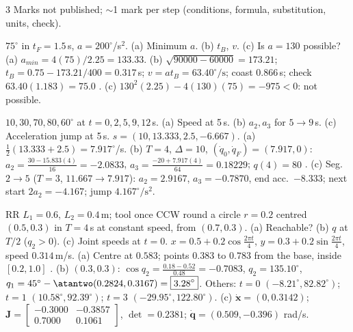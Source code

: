 \begin{multicols}{3}
Marks not published; $\sim$1 mark per step (conditions, formula, substitution, units, check).
\begin{examq}
$75^\circ$ in $t_F=1.5$\,s, $a=200^\circ$/s$^2$. (a) Minimum $a$. (b) $t_B$, $v$. (c) Is $a=130$ possible?
\solution
(a) $a_{min}=4(75)/2.25=133.33$. (b) $\sqrt{90000-60000}=173.21$; $t_B=0.75-173.21/400=0.317$\,s; $v=at_B=\boxed{63.40^\circ/\text{s}}$; coast $0.866$\,s; check $63.40(1.183)=75.0$ \checkmark. (c) $130^2(2.25)-4(130)(75)=-975<0$: not possible. \chk
\end{examq}
\begin{examq}
$10,30,70,80,60^\circ$ at $t=0,2,5,9,12$\,s. (a) Speed at 5\,s. (b) $a_2,a_3$ for $5\to9$\,s. (c) Acceleration jump at 5\,s.
\solution
$s=(10,13.333,2.5,-6.667)$. (a) $\frac12(13.333+2.5)=7.917^\circ$/s. (b) $T=4$, $\Delta=10$, $(\dot q_0,\dot q_F)=(7.917,0)$: $a_2=\frac{30-15.833(4)}{16}=-2.0833$, $a_3=\frac{-20+7.917(4)}{64}=0.18229$; $q(4)=80$ \checkmark. (c) Seg.\,$2\to5$ ($T=3$, $11.667\to7.917$): $a_2=2.9167$, $a_3=-0.7870$, end acc.\ $-8.333$; next start $2a_2=-4.167$; jump $\boxed{4.167^\circ/\text{s}^2}$. \chk
\end{examq}
\begin{examq}
RR $L_1{=}0.6$, $L_2{=}0.4$\,m; tool once CCW round a circle $r{=}0.2$ centred $(0.5,0.3)$ in $T{=}4$\,s at constant speed, from $(0.7,0.3)$. (a) Reachable? (b) $q$ at $T/2$ ($q_2>0$). (c) Joint speeds at $t{=}0$.
\solution
$x=0.5+0.2\cos\frac{2\pi t}4$, $y=0.3+0.2\sin\frac{2\pi t}4$, speed $0.314$\,m/s. (a) Centre at $0.583$; points $0.383$ to $0.783$ from the base, inside $[0.2,1.0]$ \checkmark. (b) $(0.3,0.3)$: $\cos q_2=\frac{0.18-0.52}{0.48}=-0.7083$, $q_2=135.10^\circ$, $q_1=45^\circ-\atantwo(0.2824,0.3167)=\boxed{3.28^\circ}$. Others: $t{=}0$ $(-8.21^\circ,82.82^\circ)$; $t{=}1$ $(10.58^\circ,92.39^\circ)$; $t{=}3$ $(-29.95^\circ,122.80^\circ)$. (c) $\dot{\mathbf x}=(0,0.3142)$; $\mathbf J=\begin{bmatrix}-0.3000&-0.3857\\0.7000&0.1061\end{bmatrix}$, $\det=0.2381$; $\dot{\mathbf q}=\boxed{(0.509,-0.396)}$ rad/s. \chk
\end{examq}

\end{multicols}
